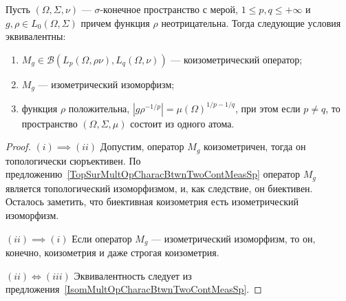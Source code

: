 \begin{proposition}\label{CoisomMultOpCharacBtwnTwoContMeasSp} Пусть
$(\Omega,\Sigma,\nu)$ --- $\sigma$-конечное пространство с мерой, 
$1\leq p,q\leq +\infty$ и $g,\rho\in L_0(\Omega,\Sigma)$ 
причем функция $\rho$ неотрицательна. Тогда следующие условия эквивалентны:

\begin{enumerate}[label = (\roman*)]
    \item $M_g\in\mathcal{B}(L_p(\Omega,\rho \nu),L_q(\Omega,\nu))$ ---
    коизометрический оператор; 

    \item $M_g$ --- изометрический изоморфизм;

    \item функция $\rho$ положительна, 
    $|g  \rho^{-1/p}|={\mu(\Omega)}^{1/p-1/q}$, при этом если $p\neq q$, 
    то пространство $(\Omega,\Sigma,\mu)$ состоит из одного атома.
\end{enumerate}
\end{proposition}
\begin{proof} $(i) \implies (ii)$ Допустим, оператор $M_g$ коизометричен, тогда
он топологически сюръективен. По
предложению~\ref{TopSurMultOpCharacBtwnTwoContMeasSp} оператор $M_g$ является
топологический изоморфизмом, и, как следствие, он биективен. Осталось заметить,
что биективная коизометрия есть изометрический изоморфизм.

$(ii) \implies (i)$ Если оператор $M_g$ --- изометрический изоморфизм, то он,
конечно, коизометрия и даже строгая коизометрия.

$(ii) \Longleftrightarrow (iii)$ Эквивалентность следует из
предложения~\ref{IsomMultOpCharacBtwnTwoContMeasSp}.
\end{proof}

